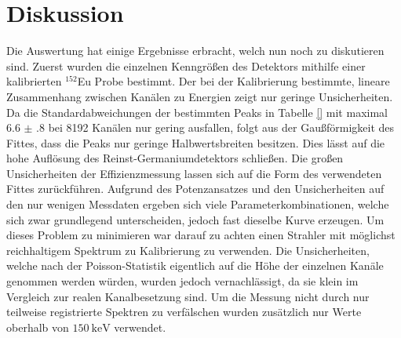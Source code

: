 
\section{Diskussion}
\label{sec:Diskussion}
Die Auswertung hat einige Ergebnisse erbracht, welch nun noch zu diskutieren sind. Zuerst wurden die einzelnen Kenngrößen des Detektors mithilfe einer kalibrierten $^{152}$Eu Probe bestimmt. Der bei der Kalibrierung bestimmte, lineare Zusammenhang zwischen Kanälen zu Energien zeigt nur geringe Unsicherheiten. Da die Standardabweichungen der bestimmten Peaks in Tabelle \ref{} mit maximal $\num{6.6(8)}$ bei 8192 Kanälen nur gering ausfallen, folgt aus der Gaußförmigkeit des Fittes, dass die Peaks nur geringe Halbwertsbreiten besitzen. Dies lässt auf die hohe Auflösung des Reinst-Germaniumdetektors schließen.
Die großen Unsicherheiten der Effizienzmessung lassen sich auf die Form des verwendeten Fittes zurückführen. Aufgrund des Potenzansatzes und den Unsicherheiten auf den nur wenigen Messdaten ergeben sich viele Parameterkombinationen, welche sich zwar grundlegend unterscheiden, jedoch fast dieselbe Kurve erzeugen. Um dieses Problem zu minimieren war darauf zu achten einen Strahler mit möglichst reichhaltigem Spektrum zu Kalibrierung zu verwenden. Die Unsicherheiten, welche nach der Poisson-Statistik eigentlich auf die Höhe der einzelnen Kanäle genommen werden würden, wurden jedoch vernachlässigt, da sie klein im Vergleich zur realen Kanalbesetzung sind. Um die Messung nicht durch nur teilweise registrierte Spektren zu verfälschen wurden zusätzlich nur Werte oberhalb von $\SI{150}{\kilo\electronvolt}$ verwendet.

